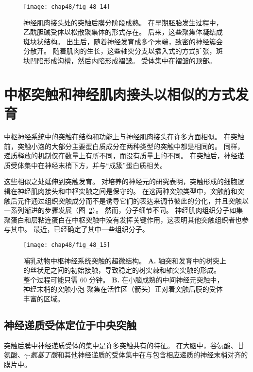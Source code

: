 \begin{figure}[htbp]
	\centering
	\texttt{[image: chap48/fig\_48\_14]}
	\caption{神经肌肉接头处的突触后膜分阶段成熟。
		在早期胚胎发生过程中，乙酰胆碱受体以松散聚集体的形式存在。
		后来，这些聚集体凝结成斑块状结构。
		出生后，随着神经发育成多个末端，致密的神经簇会分散开。
		随着肌肉的生长，这些轴突分支以插入式的方式扩张，斑块凹陷形成沟槽，然后内陷形成褶皱。
		受体集中在褶皱的顶部\cite{sanes2001induction}。}
	\label{fig:48_14}
\end{figure}



\section{中枢突触和神经肌肉接头以相似的方式发育}

中枢神经系统中的突触在结构和功能上与神经肌肉接头在许多方面相似。
在突触前，突触小泡的大部分主要蛋白质成分在两种类型的突触中都是相同的。
同样，递质释放的机制仅在数量上有所不同，而没有质量上的不同。
在突触后，神经递质受体集中在神经末梢下方，并与“成簇”蛋白质相关。


这些相似之处延伸到突触发育。
对培养的神经元的研究表明，突触形成的细胞逻辑在神经肌肉接头和中枢突触之间是保守的。
在这两种突触类型中，突触前和突触后元件通过组织突触成分而不是诱导它们的表达来调节彼此的分化，并且突触以一系列渐进的步骤发展（图~\ref{fig:48_15}）。
然而，分子细节不同。
神经肌肉组织分子如集聚蛋白和层粘连蛋白在中枢突触中没有发挥关键作用，这表明其他突触组织者也参与其中。
最近，已经确定了其中一些组织分子。


\begin{figure}[htbp]
	\centering
	\texttt{[image: chap48/fig\_48\_15]}
	\caption{哺乳动物中枢神经系统突触的超微结构。
		\textbf{A.} 轴突和发育中的树突上的丝状足之间的初始接触，导致稳定的树突棘和轴突突触的形成。
		整个过程可能只需 60 分钟。
		\textbf{B.} 在小脑成熟的中间神经元突触中，神经末梢的突触小泡 聚集在活性区（箭头）正对着突触后膜的受体丰富的区域。}
	\label{fig:48_15}
\end{figure}



\subsection{神经递质受体定位于中央突触}

突触后膜中神经递质受体的集中是许多突触共有的特征。
在大脑中，谷氨酸、甘氨酸、\textit{$ \gamma $-氨基丁酸}和其他神经递质的受体集中在与包含相应递质的神经末梢对齐的膜片中。


